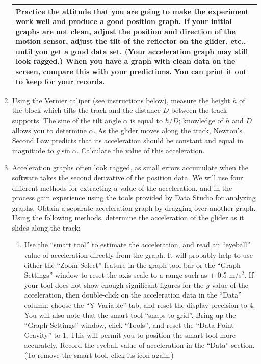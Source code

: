 \begin{enumerate}
\begin{center}
\begin{tabular}{|p{14cm}|}
\hline\tstrut
Practice the attitude that you are going to make the experiment work well and produce a good position graph.  If your initial graphs are not clean, adjust the position and direction of the motion sensor, adjust the tilt of the reflector on the glider, etc., until you get a good data set.  (Your acceleration graph may still look ragged.)  When you have a graph with clean data on the screen, compare this with your predictions.  You can print it out to keep for your records.  \bstrut\\
\hline
\end{tabular}
\end{center}

\item Using the Vernier caliper (see instructions below), measure the height \(h\) of the block which tilts the track and the distance \(D\) between the track supports.  The sine of the tilt angle \(\alpha\) is equal to \(h/D\); knowledge of \(h\) and \(D\) allows you to determine \(\alpha\).  As the glider moves along the track, Newton's Second Law predicts that its acceleration should be constant and equal in magnitude to \(g\sin\alpha\).  Calculate the value of this acceleration.

\item Acceleration graphs often look ragged, as small errors accumulate when the software takes the second derivative of the position data.  We will use four different methods for extracting a value of the acceleration, and in the process gain experience using the tools provided by Data Studio for analyzing graphs.  Obtain a separate acceleration graph by dragging over another graph.  Using the following methods, determine the acceleration of the glider as it slides along the track:

\begin{enumerate}[label=\alph*.]

\item Use the ``smart tool'' to estimate the acceleration, and read an ``eyeball'' value of acceleration directly from the graph.  It will probably help to use either the ``Zoom Select'' feature in the graph tool bar or the ``Graph Settings'' window to reset the axis scale to a range such as \(\pm\) 0.5 m/s\(^{2}\).  If your tool does not show enough significant figures for the \(y\) value of the acceleration, then double-click on the acceleration data in the ``Data'' column, choose the ``Y Variable'' tab, and reset the display precision to 4.  You will also note that the smart tool ``snaps to grid''.  Bring up the ``Graph Settings'' window, click ``Tools'', and reset the ``Data Point Gravity'' to 1.  This will permit you to position the smart tool more accurately.  Record the eyeball value of acceleration in the ``Data'' section.  (To remove the smart tool, click its icon again.)


\end{enumerate}
\end{enumerate}
